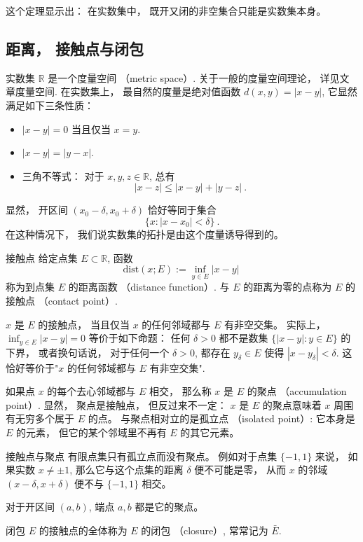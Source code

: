 这个定理显示出： 在实数集中， 既开又闭的非空集合只能是实数集本身。

\subsection{距离， 接触点与闭包}
实数集 $\mathbb{R}$ 是一个度量空间 （metric space）. 关于一般的度量空间理论， 详见文章度量空间. 在实数集上， 最自然的度量是绝对值函数 $d(x,y)=|x-y|$, 它显然满足如下三条性质：

\begin{itemize}
\item $|x-y|=0$ 当且仅当 $x=y$.
\item $|x-y|=|y-x|$.
\item 三角不等式： 对于 $x,y,z\in\mathbb{R}$, 总有
$$
|x-z|\leq|x-y|+|y-z|~.
$$
\end{itemize}

显然， 开区间 $(x_0-\delta,x_0+\delta)$ 恰好等同于集合
$$
\{x:|x-x_0|<\delta\}~.
$$
在这种情况下， 我们说实数集的拓扑是由这个度量诱导得到的。

\begin{definition}{接触点}
给定点集 $E\subset\mathbb{R}$, 函数
$$
\text{dist}(x;E):=\inf_{y\in E}|x-y|~
$$
称为到点集 $E$ 的距离函数 （distance function）. 与 $E$ 的距离为零的点称为 $E$ 的接触点 （contact point）. 
\end{definition}
$x$ 是 $E$ 的接触点， 当且仅当 $x$ 的任何邻域都与 $E$ 有非空交集。 实际上， $\inf_{y\in E}|x-y|=0$ 等价于如下命题： 任何 $\delta>0$ 都不是数集 $\{|x-y|:y\in E\}$ 的下界， 或者换句话说， 对于任何一个 $\delta>0$, 都存在 $y_\delta\in E$ 使得 $|x-y_\delta|<\delta$. 这恰好等价于"$x$ 的任何邻域都与 $E$ 有非空交集".

如果点 $x$ 的每个去心邻域都与 $E$ 相交， 那么称 $x$ 是 $E$ 的聚点 （accumulation point）. 显然， 聚点是接触点， 但反过来不一定： $x$ 是 $E$ 的聚点意味着 $x$ 周围有无穷多个属于 $E$ 的点。 与聚点相对立的是孤立点 （isolated point）: 它本身是 $E$ 的元素， 但它的某个邻域里不再有 $E$ 的其它元素。

\begin{example}{接触点与聚点}
有限点集只有孤立点而没有聚点。 例如对于点集 $\{-1,1\}$ 来说， 如果实数 $x\neq\pm1$, 那么它与这个点集的距离 $\delta$ 便不可能是零， 从而 $x$ 的邻域 $(x-\delta,x+\delta)$ 便不与 $\{-1,1\}$ 相交。

对于开区间 $(a,b)$, 端点 $a,b$ 都是它的聚点。
\end{example}

\begin{definition}{闭包}
$E$ 的接触点的全体称为 $E$ 的闭包 （closure）, 常常记为 $\bar E$.
\end{definition}

